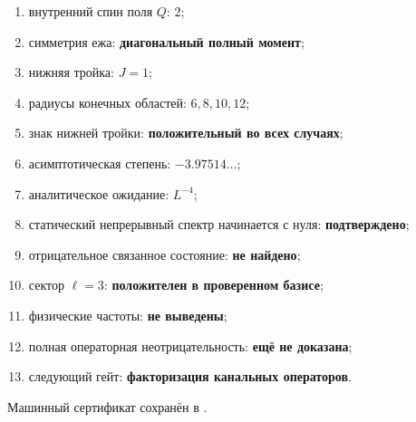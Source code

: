 \begin{protocol}
\begin{enumerate}
 \item внутренний спин поля $Q$: \textbf{$2$};
 \item симметрия ежа: \textbf{диагональный полный момент};
 \item нижняя тройка: \textbf{$J=1$};
 \item радиусы конечных областей: \textbf{$6,8,10,12$};
 \item знак нижней тройки: \textbf{положительный во всех случаях};
 \item асимптотическая степень: \textbf{$-3.97514\ldots$};
 \item аналитическое ожидание: \textbf{$L^{-4}$};
 \item статический непрерывный спектр начинается с нуля:
 \textbf{подтверждено};
 \item отрицательное связанное состояние: \textbf{не найдено};
 \item сектор $\ell=3$: \textbf{положителен в проверенном базисе};
 \item физические частоты: \textbf{не выведены};
 \item полная операторная неотрицательность: \textbf{ещё не доказана};
 \item следующий гейт: \textbf{факторизация канальных операторов}.
\end{enumerate}
\end{protocol}

Машинный сертификат сохранён в
.
